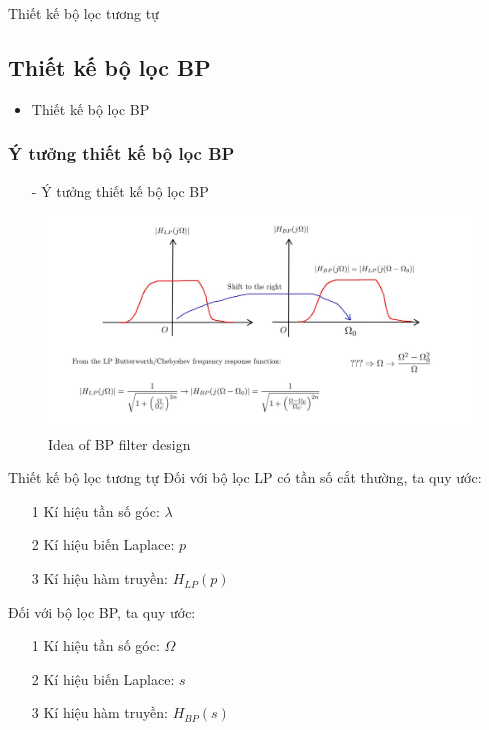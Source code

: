\documentclass[8pt]{beamer}
\begin{document}
\begin{frame}{Thiết kế bộ lọc tương tự}
\subsection{Thiết kế bộ lọc BP}
\begin{itemize}
	\item Thiết kế bộ lọc BP
\end{itemize}
\subsubsection{Ý tưởng thiết kế bộ lọc BP}
\begin{itemize}
	\item[-] Ý tưởng thiết kế bộ lọc BP 
\end{itemize}
\begin{figure}[h]
	\includegraphics[width=1\textwidth]{17.jpg}
	\caption{Idea of BP filter design}			\label{fig:re2}
		\end{figure}

\end{frame}
\begin{frame}{Thiết kế bộ lọc tương tự}
Đối với bộ lọc LP \alert{có tần số cắt thường}, ta quy ước:
\begin{enumerate}
	\item[1] Kí hiệu tần số góc: $\lambda$
	\item[2] Kí hiệu biến Laplace: $p$
	\item[3] Kí hiệu hàm truyền: $H_{LP}(p)$
\end{enumerate}
Đối với bộ lọc BP, ta quy ước:

\begin{enumerate}
	\item[1] Kí hiệu tần số góc: $\Omega$
	\item[2] Kí hiệu biến Laplace: $s$
	\item[3] Kí hiệu hàm truyền: $H_{BP}(s)$
\end{enumerate}
\end{frame}
\end{document}
